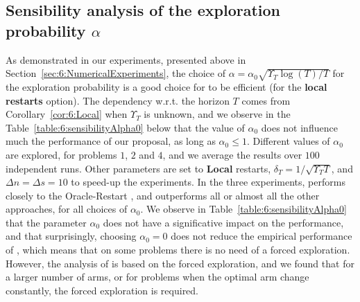 \subsection{Sensibility analysis of the exploration probability $\alpha$}\label{sec:6:choosingAlpha0}

As demonstrated in our experiments,
presented above in Section~\ref{sec:6:NumericalExperiments},
the choice of $\alpha=\alpha_0\sqrt{\Upsilon_T\log(T)/T}$ for the exploration probability is a good choice for \GLRklUCB{} to be efficient (for the \textbf{local restarts} option).
The dependency w.r.t. the horizon $T$ comes from Corollary~\ref{cor:6:Local} when $\Upsilon_T$ is unknown, and we observe in the Table~\ref{table:6:sensibilityAlpha0} below that the value of $\alpha_0$ does not influence much the performance of our proposal, as long as $\alpha_0\leq1$.
Different values of $\alpha_0$ are explored, for problems $1$, $2$ and $4$, and we average the results over $100$ independent runs.
Other parameters are set to \textbf{Local} restarts, $\delta_T=1/\sqrt{\Upsilon_T T}$, and $\Delta n = \Delta s = 10$ to speed-up the experiments.
%
In the three experiments, \GLRklUCB{} performs closely to the Oracle-Restart \klUCB{}, and outperforms all or almost all the other approaches, for all choices of $\alpha_0$.
We observe in Table~\ref{table:6:sensibilityAlpha0} that the parameter $\alpha_0$ does not have a significative impact on the performance,
and that surprisingly, choosing $\alpha_0 = 0$ does not reduce the empirical performance of \GLRklUCB, which means that on some problems there is no need of a forced exploration.
However, the analysis of \GLRklUCB{} is based on the forced exploration, and we found that for a larger number of arms, or for problems when the optimal arm change constantly, the forced exploration is required.

